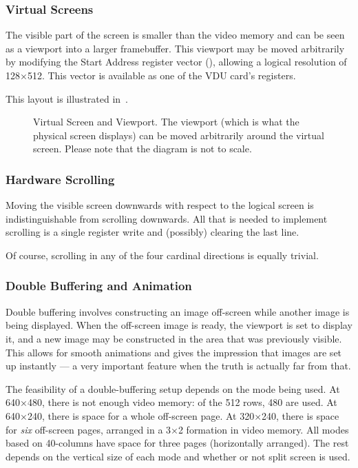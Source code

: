 \subsubsection{Virtual Screens}

The visible part of the screen is smaller than the video memory and can be seen
as a viewport into a larger framebuffer. This viewport may be moved arbitrarily
by modifying the Start Address register vector (), allowing a
logical resolution of 128×512. This vector is available as one of the VDU
card's registers.

This layout is illustrated in~.

\begin{figure}
 \centering
 \caption[Virtual Screen]{\label{fig:vdu-virtual-screen} Virtual Screen and
   Viewport. The viewport (which is what the physical screen displays) can be
   moved arbitrarily around the virtual screen. Please note that the diagram is not to scale.
 }
\end{figure}




\subsubsection{Hardware Scrolling}

Moving the visible screen downwards with respect to the logical screen is
indistinguishable from scrolling downwards. All that is needed to implement
scrolling is a single register write and (possibly) clearing the last line.

Of course, scrolling in any of the four cardinal directions is equally trivial.

\subsubsection{Double Buffering and Animation}

Double buffering involves constructing an image off-screen while another image
is being displayed. When the off-screen image is ready, the viewport is set to
display it, and a new image may be constructed in the area that was previously
visible. This allows for smooth animations and gives the impression that images
are set up instantly — a very important feature when the truth is actually far
from that.

The feasibility of a double-buffering setup depends on the mode being used. At
640×480, there is not enough video memory: of the 512 rows, 480 are used. At
640×240, there is space for a whole off-screen page. At 320×240, there is space
for {\em six\/} off-screen pages, arranged in a 3×2 formation in video
memory. All modes based on 40-columns have space for three pages (horizontally
arranged). The rest depends on the vertical size of each mode and whether or
not split screen is used.


